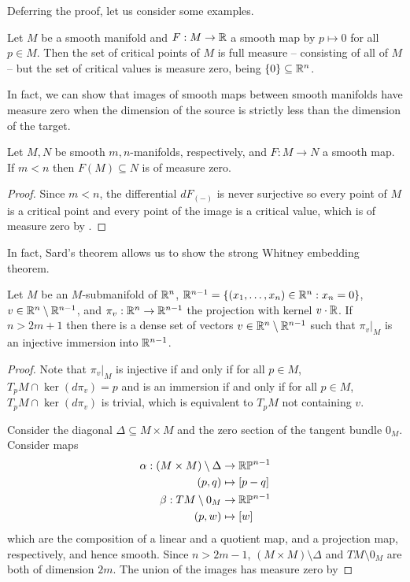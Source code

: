Deferring the proof, let us consider some examples. 
\begin{example}
    Let $M$ be a smooth manifold and $F:M\to\mathbb{R}$ a smooth map by $p\mapsto0$ for all $p\in M$. Then the set of critical points of $M$ is full measure -- consisting of all of $M$ -- but the set of critical values is measure zero, being $\{0\}\subseteq\mathbb{R}^{n}$. 
\end{example}
In fact, we can show that images of smooth maps between smooth manifolds have measure zero when the dimension of the source is strictly less than the dimension of the target. 
\begin{corollary}\label{corr: image of measure zero by dimension}
    Let $M,N$ be smooth $m,n$-manifolds, respectively, and $F:M\to N$ a smooth map. If $m<n$ then $F(M)\subseteq N$ is of measure zero. 
\end{corollary}
\begin{proof}
    Since $m<n$, the differential $dF_{(-)}$ is never surjective so every point of $M$ is a critical point and every point of the image is a critical value, which is of measure zero by .
\end{proof}
In fact, Sard's theorem allows us to show the strong Whitney embedding theorem. 
\begin{lemma}\label{lem: projection lemma}
    Let $M$ be an $M$-submanifold of $\mathbb{R}^{n}$, $\mathbb{R}^{n-1}=\{(x_{1},\dots,x_{n})\in\mathbb{R}^{n}:x_{n}=0\}$, $v\in\mathbb{R}^{n}\setminus\mathbb{R}^{n-1}$, and $\pi_{v}:\mathbb{R}^{n}\to\mathbb{R}^{n-1}$ the projection with kernel $v\cdot\mathbb{R}$. If $n>2m+1$ then there is a dense set of vectors $v\in\mathbb{R}^{n}\setminus\mathbb{R}^{n-1}$ such that $\pi_{v}|_{M}$ is an injective immersion into $\mathbb{R}^{n-1}$. 
\end{lemma}
\begin{proof}
    Note that $\pi_{v}|_{M}$ is injective if and only if for all $p\in M$, $T_{p}M\cap\ker(d\pi_{v})=p$ and is an immersion if and only if for all $p\in M$, $T_{p}M\cap\ker(d\pi_{v})$ is trivial, which is equivalent to $T_{p}M$ not containing $v$. 

    Consider the diagonal $\Delta\subseteq M\times M$ and the zero section of the tangent bundle $0_{M}$. Consider maps 
    \begin{align*}
        \alpha: (M\times M)\setminus\Delta&\to\mathbb{R}\mathbb{P}^{n-1}\\
        (p,q)&\mapsto[p-q] \\
        \beta: TM\setminus 0_{M}&\to\mathbb{R}\mathbb{P}^{n-1}\\
        (p,w)&\mapsto[w]
    \end{align*}
    which are the composition of a linear and a quotient map, and a projection map, respectively, and hence smooth. Since $n>2m-1$, $(M\times M)\setminus\Delta$ and $TM\setminus 0_{M}$ are both of dimension $2m$. The union of the images has measure zero by 
\end{proof}
